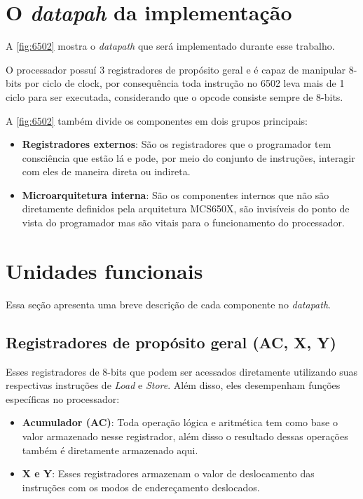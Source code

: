 \documentclass[
	12pt,				  %
	openright,		%
	a4paper,			%
	english,			%
	french,				%
	spanish,			%
	brazil,				%
]{abntex2}
\begin{document}
\section{O \emph{datapah} da implementação}
A \autoref{fig:6502} mostra o \emph{datapath} que será implementado durante esse
trabalho.

O processador possuí 3 registradores de propósito geral e é capaz de manipular
8-bits por ciclo de clock, por consequência toda instrução no 6502 leva mais de
1 ciclo para ser executada, considerando que o opcode consiste sempre de 8-bits.

A \autoref{fig:6502} também divide os componentes em dois grupos principais:
\begin{itemize}
	\item \textbf{Registradores externos}: São os registradores que o programador
	      tem consciência que estão lá e pode, por meio do conjunto de instruções,
	      interagir com eles de maneira direta ou indireta.
	\item \textbf{Microarquitetura interna}: São os componentes internos que não
	      são diretamente definidos pela arquitetura MCS650X, são invisíveis do
	      ponto de vista do programador mas são vitais para o funcionamento do
	      processador.
\end{itemize}

\section{Unidades funcionais}
Essa seção apresenta uma breve descrição de cada componente no \emph{datapath}.

\subsection{Registradores de propósito geral (AC, X, Y)}
Esses registradores de 8-bits que podem ser acessados diretamente utilizando
suas respectivas instruções de \emph{Load} e \emph{Store}. Além disso, eles
desempenham funções específicas no processador:
\begin{itemize}
	\item \textbf{Acumulador (AC)}: Toda operação lógica e aritmética tem como
	      base o valor armazenado nesse registrador, além disso o resultado dessas
	      operações também é diretamente armazenado aqui.
	\item \textbf{X e Y}: Esses registradores armazenam o valor de deslocamento
	      das instruções com os modos de endereçamento deslocados.
\end{itemize}
\end{document}
